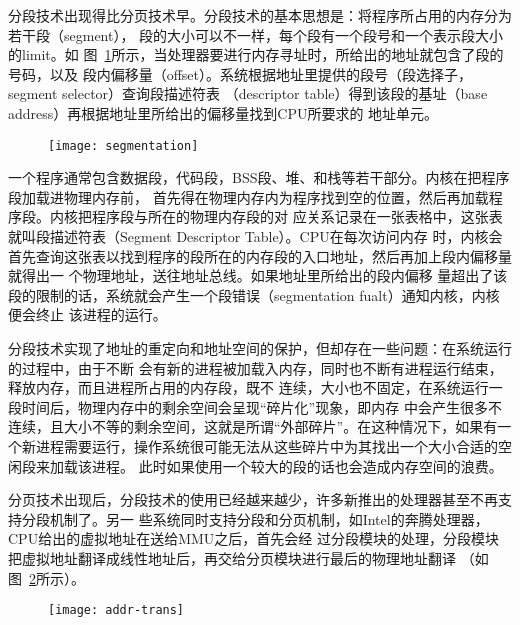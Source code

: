 \documentclass{swfcthesismscctex}
\begin{document}
分段技术出现得比分页技术早。分段技术的基本思想是：将程序所占用的内存分为若干段（segment），
段的大小可以不一样，每个段有一个段号和一个表示段大小的limit\cite{duarte:mem}。如
图~\ref{fig:segmentation}所示，当处理器要进行内存寻址时，所给出的地址就包含了段的号码，以及
段内偏移量（offset）。系统根据地址里提供的段号（段选择子，segment selector）查询段描述符表
（descriptor table）得到该段的基址（base address）再根据地址里所给出的偏移量找到CPU所要求的
地址单元。

\begin{figure}[!ht]
  \centering
  \texttt{[image: segmentation]}
  \label{fig:segmentation}
\end{figure}

一个程序通常包含数据段，代码段，BSS段、堆、和栈等若干部分。内核在把程序段加载进物理内存前，
首先得在物理内存内为程序找到空的位置，然后再加载程序段。内核把程序段与所在的物理内存段的对
应关系记录在一张表格中，这张表就叫段描述符表（Segment Descriptor Table）。CPU在每次访问内存
时，内核会首先查询这张表以找到程序的段所在的内存段的入口地址，然后再加上段内偏移量就得出一
个物理地址，送往地址总线\cite{brey2009intel,x86assemblymanual}。如果地址里所给出的段内偏移
量超出了该段的限制的话，系统就会产生一个段错误（segmentation fualt）通知内核，内核便会终止
该进程的运行。

分段技术实现了地址的重定向和地址空间的保护，但却存在一些问题：在系统运行的过程中，由于不断
会有新的进程被加载入内存，同时也不断有进程运行结束，释放内存，而且进程所占用的内存段，既不
连续，大小也不固定，在系统运行一段时间后，物理内存中的剩余空间会呈现``碎片化''现象，即内存
中会产生很多不连续，且大小不等的剩余空间，这就是所谓``外部碎片''。在这种情况下，如果有一
个新进程需要运行，操作系统很可能无法从这些碎片中为其找出一个大小合适的空闲段来加载该进程。
此时如果使用一个较大的段的话也会造成内存空间的浪费。

分页技术出现后，分段技术的使用已经越来越少，许多新推出的处理器甚至不再支持分段机制了。另一
些系统同时支持分段和分页机制，如Intel的奔腾处理器，CPU给出的虚拟地址在送给MMU之后，首先会经
过分段模块的处理，分段模块把虚拟地址翻译成线性地址后，再交给分页模块进行最后的物理地址翻译
（如图~\ref{fig:addr-trans}所示）。

\begin{figure}[!ht]
  \centering
  \texttt{[image: addr-trans]}
  \label{fig:addr-trans}
\end{figure}
\end{document}
